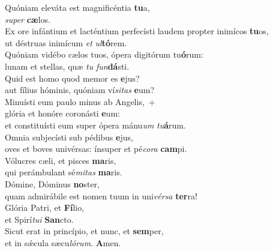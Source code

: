 \evenverse Quóniam eleváta est magnificéntia \textbf{tu}a,~\*\\
\evenverse \textit{su}\textit{per} \textbf{cæ}los.\\
\oddverse Ex ore infántium et lacténtium perfecísti laudem propter inimícos \textbf{tu}os,~\*\\
\oddverse ut déstruas inimícum \textit{et} \textit{ul}\textbf{tó}rem.\\
\evenverse Quóniam vidébo cælos tuos, ópera digitórum tu\textbf{ó}rum:~\*\\
\evenverse lunam et stellas, quæ \textit{tu} \textit{fun}\textbf{dá}sti.\\
\oddverse Quid est homo quod memor es \textbf{e}jus?~\*\\
\oddverse aut fílius hóminis, quóniam ví\textit{si}\textit{tas} \textbf{e}um?\\
\evenverse Minuísti eum paulo minus ab Angelis,~+\\
\evenverse  glória et honóre coronásti \textbf{e}um:~\*\\
\evenverse et constituísti eum super ópera mánu\textit{um} \textit{tu}\textbf{á}rum.\\
\oddverse Omnia subjecísti sub pédibus \textbf{e}jus,~\*\\
\oddverse oves et boves univérsas: ínsuper et pé\textit{co}\textit{ra} \textbf{cam}pi.\\
\evenverse Vólucres cæli, et pisces \textbf{ma}ris,~\*\\
\evenverse qui perámbulant sé\textit{mi}\textit{tas} \textbf{ma}ris.\\
\oddverse Dómine, Dóminus \textbf{no}ster,~\*\\
\oddverse quam admirábile est nomen tuum in uni\textit{vér}\textit{sa} \textbf{ter}ra!\\
\evenverse Glória Patri, et \textbf{Fí}lio,~\*\\
\evenverse et Spirí\textit{tu}\textit{i} \textbf{San}cto.\\
\oddverse Sicut erat in princípio, et nunc, et \textbf{sem}per,~\*\\
\oddverse et in sǽcula sæcu\textit{ló}\textit{rum}. \textbf{A}men.\\
